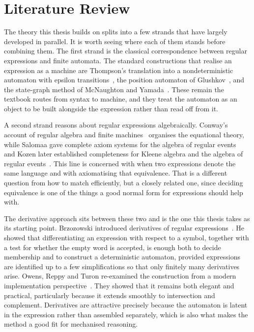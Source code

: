 \section{Literature Review}\label{sec:literature}

The theory this thesis builds on splits into a few strands that have largely
developed in parallel. It is worth seeing where each of them stands before
combining them. The first strand is the classical correspondence between regular
expressions and finite automata. The standard constructions that realise an
expression as a machine are Thompson's translation into a nondeterministic automaton
with epsilon transitions~\cite{Thompson1968}, the position automaton of
Glushkov~\cite{Glushkov1962}, and the state-graph method of McNaughton and
Yamada~\cite{McNaughtonYamada1960}. These remain the textbook routes from syntax to
machine, and they treat the automaton as an object to be built alongside the
expression rather than read off from it.

A second strand reasons about regular expressions algebraically. Conway's account of
regular algebra and finite machines~\cite{C71} organises the equational theory,
while Salomaa gave complete axiom systems for the algebra of regular
events~\cite{Salomaa} and Kozen later established completeness for Kleene algebra
and the algebra of regular events~\cite{Kozen}. This line is concerned with when two
expressions denote the same language and with axiomatising that equivalence. That
is a different question from how to match efficiently, but a closely related one,
since deciding equivalence is one of the things a good normal form for expressions
should help with.

The derivative approach sits between these two and is the one this thesis takes as
its starting point. Brzozowski introduced derivatives of regular
expressions~\cite{B64}. He showed that differentiating an expression with respect to
a symbol, together with a test for whether the empty word is accepted, is enough
both to decide membership and to construct a deterministic automaton, provided
expressions are identified up to a few simplifications so that only finitely many
derivatives arise. Owens, Reppy and Turon re-examined the construction from a modern
implementation perspective~\cite{OwensReppyTuron}. They showed that it remains both
elegant and practical, particularly because it extends smoothly to intersection and
complement. Derivatives are attractive precisely because the automaton is latent in
the expression rather than assembled separately, which is also what makes the method
a good fit for mechanised reasoning.

